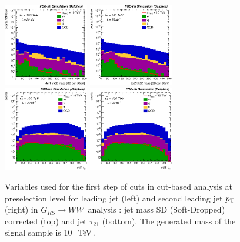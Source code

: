 \documentclass{cernrep}
\newcommand*{\rsg}{\ensuremath{G_{RS} \rightarrow WW}}
\begin{document}
\begin{figure}[!htb]\centering
\includegraphics[width=0.33\textwidth]{Fig/RSGww/Jet1_trk02_SD_Cor_m_sel0_nostack_log.eps}
\includegraphics[width=0.33\textwidth]{Fig/RSGww/Jet2_trk02_SD_Cor_m_sel0_nostack_log.eps}
\includegraphics[width=0.33\textwidth]{Fig/RSGww/Jet1_tau21_sel0_nostack_log.eps}
\includegraphics[width=0.33\textwidth]{Fig/RSGww/Jet2_tau21_sel0_nostack_log.eps}
\caption{Variables used for the first step of cuts in cut-based analysis at preselection level for leading jet (left) and second leading jet $p\sb{\scriptstyle\mathrm{T}}$ (right) in \rsg\ analysis : jet mass SD (Soft-Dropped) corrected (top) and jet $\tau_{21}$ (bottom). The generated mass of the signal sample is 10 $\TeV$.}
\label{fig:RSGww_sel0_cut}
\end{figure}
\end{document}

